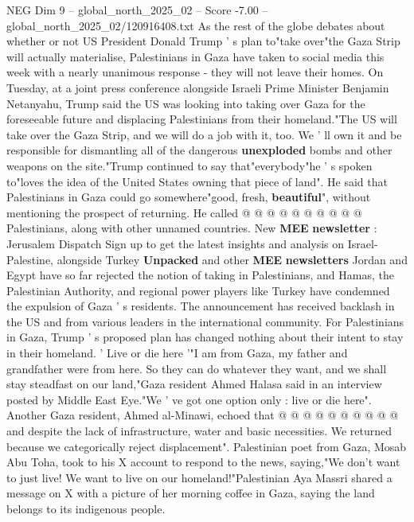 \begin{textsample}{NEG Dim 9 – global\_north\_2025\_02 – Score -7.00 – global\_north\_2025\_02/120916408.txt}  \label{ex:f9_neg_005}
As the rest of the globe debates about whether or not US President Donald Trump ' s plan to"take over"the Gaza Strip will actually materialise, Palestinians in Gaza have taken to social media this week with a nearly unanimous response - they will not leave their homes.
On Tuesday, at a joint press conference alongside Israeli Prime Minister Benjamin Netanyahu, Trump said the US was looking into taking over Gaza for the foreseeable future and displacing Palestinians from their homeland."The US will take over the Gaza Strip, and we will do a job with it, too.
We ' ll own it and be responsible for dismantling all of the dangerous \textbf{unexploded} bombs and other weapons on the site."Trump continued to say that"everybody"he ' s spoken to"loves the idea of the United States owning that piece of land".
He said that Palestinians in Gaza could go somewhere"good, fresh, \textbf{beautiful}", without mentioning the prospect of returning.
He called @ @ @ @ @ @ @ @ @ @ Palestinians, along with other unnamed countries.
New \textbf{MEE} \textbf{newsletter} : Jerusalem Dispatch Sign up to get the latest insights and analysis on Israel-Palestine, alongside Turkey \textbf{Unpacked} and other \textbf{MEE} \textbf{newsletters} Jordan and Egypt have so far rejected the notion of taking in Palestinians, and Hamas, the Palestinian Authority, and regional power players like Turkey have condemned the expulsion of Gaza ' s residents.
The announcement has received backlash in the US and from various leaders in the international community.
For Palestinians in Gaza, Trump ' s proposed plan has changed nothing about their intent to stay in their homeland. ' Live or die here '"I am from Gaza, my father and grandfather were from here.
So they can do whatever they want, and we shall stay steadfast on our land,"Gaza resident Ahmed Halasa said in an interview posted by Middle East Eye."We ' ve got one option only : live or die here".
Another Gaza resident, Ahmed al-Minawi, echoed that @ @ @ @ @ @ @ @ @ @ and despite the lack of infrastructure, water and basic necessities.
We returned because we categorically reject displacement".
Palestinian poet from Gaza, Mosab Abu Toha, took to his X account to respond to the news, saying,"We don't want to just live!
We want to live on our homeland!"Palestinian Aya Massri shared a message on X with a picture of her morning coffee in Gaza, saying the land belongs to its indigenous people.

\end{textsample}
